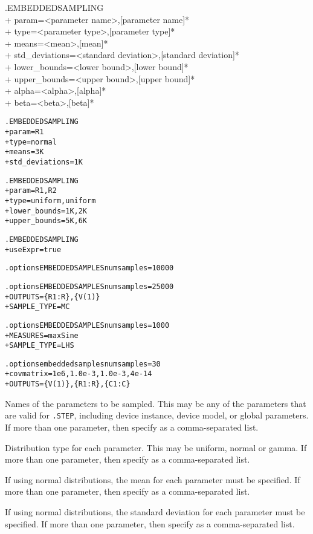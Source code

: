 \begin{Command}
\format
.EMBEDDEDSAMPLING  \\
+ param=<parameter name>,[parameter name]*  \\
+ type=<parameter type>,[parameter type]*  \\
+ means=<mean>,[mean]*  \\
+ std\_deviations=<standard deviation>,[standard deviation]* \\
+ lower\_bounds=<lower bound>,[lower bound]*  \\
+ upper\_bounds=<upper bound>,[upper bound]* \\
+ alpha=<alpha>,[alpha]*  \\
+ beta=<beta>,[beta]*

\examples
\begin{alltt}
.EMBEDDEDSAMPLING
+ param=R1
+ type=normal
+ means=3K
+ std\_deviations=1K

.EMBEDDEDSAMPLING
+ param=R1,R2
+ type=uniform,uniform
+ lower\_bounds=1K,2K
+ upper\_bounds=5K,6K

.EMBEDDEDSAMPLING
+ useExpr=true

.options EMBEDDEDSAMPLES numsamples=10000

.options EMBEDDEDSAMPLES numsamples=25000
+ OUTPUTS=\{R1:R\},\{V(1)\}
+ SAMPLE\_TYPE=MC

.options EMBEDDEDSAMPLES numsamples=1000
+ MEASURES=maxSine
+ SAMPLE\_TYPE=LHS

.options embeddedsamples numsamples=30
+ covmatrix=1e6,1.0e-3,1.0e-3,4e-14
+ OUTPUTS=\{V(1)\},\{R1:R\},\{C1:C\}
\end{alltt}

\arguments

\begin{Arguments}

Names of the parameters to be sampled.  This may be any of the parameters
that are valid for \verb|.STEP|, including device instance, device model,
or global parameters.  If more than one parameter, then specify as a
comma-separated list.

Distribution type for each parameter.  This may be uniform, normal or gamma.
If more than one parameter, then specify as a comma-separated list.

If using normal distributions, the mean for each parameter must be specified.
If more than one parameter, then specify as a comma-separated list.

If using normal distributions, the standard deviation for each parameter
must be specified.  If more than one parameter, then specify as a
comma-separated list.


\end{Arguments}
\end{Command}
